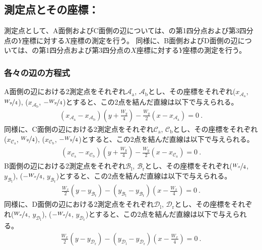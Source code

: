 \subsection{測定点とその座標：\EndFaceOutChamfer}
測定点として、A面側およびC面側の辺については、\BDOD の第1四分点および第3四分点の$Y$座標に対する$X$座標の測定を行う。
同様に、B面側およびD面側の辺については、\ACOD の第1四分点および第3四分点の$X$座標に対する$Y$座標の測定を行う。

\subsubsection{各々の辺の方程式}
A面側の辺における2測定点をそれぞれ$\mathcal A_\mathrm a$, $\mathcal A_\mathrm b$とし、その座標をそれぞれ($x_{\mathcal A_\mathrm a}$, $\nicefrac{W_y}4$), ($x_{\mathcal A_\mathrm b}$, $-\nicefrac{W_y}4$)とすると、この2点を結んだ直線は以下で与えられる。
\begin{align*}
  \left(x_{\mathcal A_\mathrm a}-x_{\mathcal A_\mathrm b}\right)\left(y+\frac{W_y}4\right)
  -\frac{W_y}2\left(x-x_{\mathcal A_\mathrm a}\right)
  = 0\ .
\end{align*}
同様に、C面側の辺における2測定点をそれぞれ$\mathcal C_\mathrm a$, $\mathcal C_\mathrm b$とし、その座標をそれぞれ($x_{\mathcal C_\mathrm a}$, $\nicefrac{W_y}4$), ($x_{\mathcal C_\mathrm b}$, $-\nicefrac{W_y}4$)とすると、この2点を結んだ直線は以下で与えられる。
\begin{align*}
  \left(x_{\mathcal C_\mathrm a}-x_{\mathcal C_\mathrm b}\right)\left(y+\frac{W_y}4\right)
  -\frac{W_y}2\left(x-x_{\mathcal C_\mathrm a}\right)
  = 0\ .
\end{align*}
B面側の辺における2測定点をそれぞれ$\mathcal B_\mathrm l$, $\mathcal B_\mathrm r$とし、その座標をそれぞれ($\nicefrac{W_x}4$, $y_{\mathcal B_\mathrm l}$), ($-\nicefrac{W_x}4$, $y_{\mathcal B_\mathrm r}$)とすると、この2点を結んだ直線は以下で与えられる。
\begin{align*}
  \frac{W_x}2\left(y-y_{\mathcal B_\mathrm r}\right)
  -\left(y_{\mathcal B_\mathrm l}-y_{\mathcal B_\mathrm r}\right)\left(x-\frac{W_x}4\right)
  = 0\ .
\end{align*}
同様に、D面側の辺における2測定点をそれぞれ$\mathcal D_\mathrm l$, $\mathcal D_\mathrm r$とし、その座標をそれぞれ($\nicefrac{W_x}4$, $y_{\mathcal D_\mathrm l}$), ($-\nicefrac{W_x}4$, $y_{\mathcal D_\mathrm r}$)とすると、この2点を結んだ直線は以下で与えられる。
\begin{align*}
  \frac{W_x}2\left(y-y_{\mathcal D_\mathrm r}\right)
  -\left(y_{\mathcal D_\mathrm l}-y_{\mathcal D_\mathrm r}\right)\left(x-\frac{W_x}4\right)
  = 0\ .
\end{align*}

